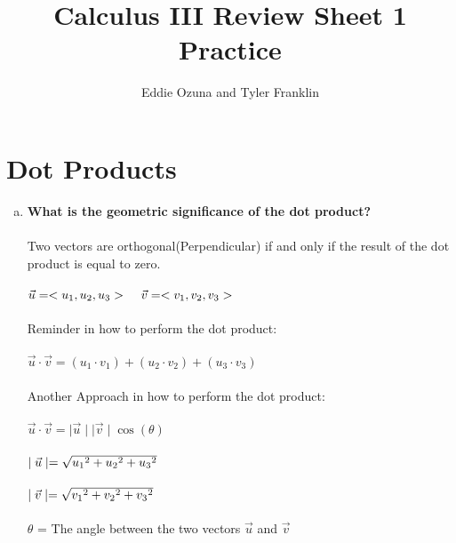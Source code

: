 \documentclass{article}
\title{Calculus III Review Sheet 1 Practice}
\author{Eddie Ozuna and Tyler Franklin}
\begin{document}
\maketitle
\section{Dot Products}
\begin{enumerate}[a.]
	\item \textbf{What is the geometric significance of the dot product? }\\
	      \\
	      Two vectors are orthogonal(Perpendicular) if and only if the result of the dot product is equal to zero.\\\\
	      $\vec{u} = <u_{1},u_{2},u_{3}>\hspace{.4cm}\vec{v} = <v_{1},v_{2},v_{3}>$\\
	      \\
	      Reminder in how to perform the dot product:\\
	      \\
	      $\vec{u} \cdot \vec{v} = (u_{1} \cdot v_{1}) + (u_{2} \cdot v_{2}) + (u_{3} \cdot v_{3}) $\\
	      \\
	      Another Approach in how to perform the dot product:\\
	      \\
	      $\vec{u} \cdot \vec{v} =  \mid\vec{u}\mid\mid\vec{v}\mid\cos(\theta)$\\
	      \\
	      $\mid\vec{u}\mid = \sqrt{u_{1}\hspace{.001cm}^{2}+u_{2}\hspace{.001cm}^{2}+u_{3}\hspace{.001cm}^{2}}$\\
	      \\
	      $\mid\vec{v}\mid = \sqrt{v_{1}\hspace{.001cm}^{2}+v_{2}\hspace{.001cm}^{2}+v_{3}\hspace{.001cm}^{2}}$\\
	      \\
	      $\theta$ = The angle between the two vectors $\vec{u}$ and $\vec{v}$
\end{enumerate}
\end{document}
